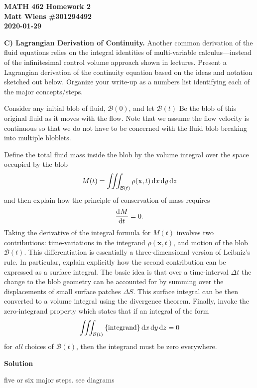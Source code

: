 \documentclass{article}
\def\*#1{\mathbf{#1}}
\newcommand{\B}{\mathcal{B}}
\begin{document}
\textbf{MATH 462 Homework 2} \\
\textbf{Matt Wiens \#301294492} \\
\textbf{2020-01-29}

\textbf{C) Lagrangian Derivation of Continuity.} Another common
derivation of the fluid equations relies on the integral identities of
multi-variable calculus---instead of the infinitesimal control volume
approach shown in lectures. Present a Lagrangian derivation of the
continuity equation based on the ideas and notation sketched out below.
Organize your write-up as a numbers list identifying each of the major
concepts/steps.

Consider any initial blob of fluid, $\B(0)$, and let $\B(t)$ Be the blob
of this original fluid as it moves with the flow. Note that we assume
the flow velocity is continuous so that we do not have to be concerned
with the fluid blob breaking into multiple bloblets.

Define the total fluid mass inside the blob by the volume integral over
the space occupied by the blob
%
\begin{equation*}
    M(t) = \iiint_{\B(t)} \rho(\*x, t) \dif x \dif y \dif z
\end{equation*}
%
and then explain how the principle of conservation of mass requires
%
\begin{equation*}
    \dod{M}{t} = 0
    .
\end{equation*}
%
Taking the derivative of the integral formula for $M(t)$ involves two
contributions: time-variations in the integrand $\rho(\*x, t)$, and
motion of the blob $\B(t)$. This differentiation is essentially a
three-dimensional version of Leibniz's rule. In particular, explain
explicitly how the second contribution can be expressed as a surface
integral. The basic idea is that over a time-interval $\Delta t$ the
change to the blob geometry can be accounted for by summing over the
displacements of small surface patches $\Delta S$. This surface integral
can be then converted to a volume integral using the divergence theorem.
Finally, invoke the zero-integrand property which states that if an
integral of the form
%
\begin{equation*}
    \iiint_{\B(t)} \cbr{\text{integrand}} \dif x \dif y \dif z = 0
\end{equation*}
%
for \textit{all} choices of $\B(t)$, then the integrand must be zero
everywhere.

\textbf{Solution}

five or six major steps. see diagrams
\end{document}
